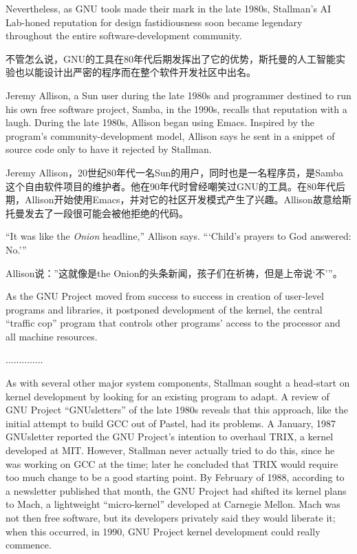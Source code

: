 \ifdefined\eng
Nevertheless, as GNU tools made their mark in the late 1980s, Stallman's AI Lab-honed reputation for design fastidiousness soon became legendary throughout the entire software-development community.
\fi

\ifdefined\chs
不管怎么说，GNU的工具在80年代后期发挥出了它的优势，斯托曼的人工智能实验也以能设计出严密的程序而在整个软件开发社区中出名。
\fi

\ifdefined\eng
Jeremy Allison, a Sun user during the late 1980s and programmer destined to run his own free software project, Samba, in the 1990s, recalls that reputation with a laugh. During the late 1980s, Allison began using Emacs. Inspired by the program's community-development model, Allison says he sent in a snippet of source code only to have it rejected by Stallman.
\fi

\ifdefined\chs
Jeremy Allison，20世纪80年代一名Sun的用户，同时也是一名程序员，是Samba这个自由软件项目的维护者。他在90年代时曾经嘲笑过GNU的工具。在80年代后期，Allison开始使用Emacs，并对它的社区开发模式产生了兴趣。Allison故意给斯托曼发去了一段很可能会被他拒绝的代码。
\fi

\ifdefined\eng
``It was like the \textit{Onion} headline,'' Allison says. ``\hspace{0.01in}`Child's prayers to God answered: No.'\hspace{0.01in}''
\fi

\ifdefined\chs
Allison说：''这就像是the Onion的头条新闻，孩子们在祈祷，但是上帝说`不'\hspace{0.01in}''。
\fi

\ifdefined\eng
As the GNU Project moved from success to success in creation of user-level programs and libraries, it postponed development of the kernel, the central ``traffic cop'' program that controls other programs' access to the processor and all machine resources.
\fi

\ifdefined\chs
..............
\fi

\ifdefined\eng
As with several other major system components, Stallman sought a head-start on kernel development by looking for an existing program to adapt. A review of GNU Project ``GNUsletters'' of the late 1980s reveals that this approach, like the initial attempt to build GCC out of Pastel, had its problems. A January, 1987 GNUsletter reported the GNU Project's intention to overhaul TRIX, a kernel developed at MIT. However, Stallman never actually tried to do this, since he was working on GCC at the time; later he concluded that TRIX would require too much change to be a good starting point. By February of 1988, according to a newsletter published that month, the GNU Project had shifted its kernel plans to Mach, a lightweight ``micro-kernel'' developed at Carnegie Mellon. Mach was not then free software, but its developers privately said they would liberate it; when this occurred, in 1990, GNU Project kernel development could really commence.
\fi

